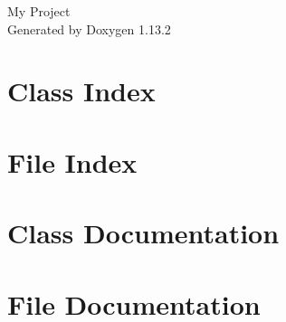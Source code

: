 \documentclass[twoside]{book}
\newcommand{\+}{\discretionary{\mbox{\scriptsize$\hookleftarrow$}}{}{}}
\newcommand{\clearemptydoublepage}{%
    \newpage{\pagestyle{empty}\cleardoublepage}%
  }
\begin{document}
  \raggedbottom
    \hypersetup{pageanchor=false,
                bookmarksnumbered=true,
                pdfencoding=unicode
               }
  \begin{titlepage}
  \vspace*{7cm}
  \begin{center}%
  {\Large My Project}\\
  \vspace*{1cm}
  {\large Generated by Doxygen 1.13.2}\\
  \end{center}
  \end{titlepage}
  \clearemptydoublepage
  \tableofcontents
  \clearemptydoublepage
  \hypersetup{pageanchor=true}



\chapter{Class Index}

\chapter{File Index}

\chapter{Class Documentation}

\chapter{File Documentation}

  \backmatter
  \newpage
  \clearemptydoublepage
  \printindex
\end{document}

